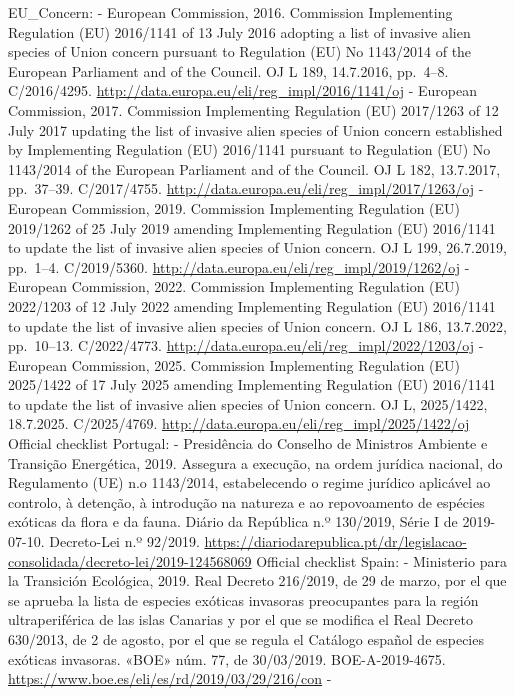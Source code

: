 \documentclass[
]{article}
\begin{document}
EU\_Concern: - European Commission, 2016. Commission Implementing
Regulation (EU) 2016/1141 of 13 July 2016 adopting a list of invasive
alien species of Union concern pursuant to Regulation (EU) No 1143/2014
of the European Parliament and of the Council. OJ L 189, 14.7.2016,
pp.~4--8. C/2016/4295.
\url{http://data.europa.eu/eli/reg_impl/2016/1141/oj} - European
Commission, 2017. Commission Implementing Regulation (EU) 2017/1263 of
12 July 2017 updating the list of invasive alien species of Union
concern established by Implementing Regulation (EU) 2016/1141 pursuant
to Regulation (EU) No 1143/2014 of the European Parliament and of the
Council. OJ L 182, 13.7.2017, pp.~37--39. C/2017/4755.
\url{http://data.europa.eu/eli/reg_impl/2017/1263/oj} - European
Commission, 2019. Commission Implementing Regulation (EU) 2019/1262 of
25 July 2019 amending Implementing Regulation (EU) 2016/1141 to update
the list of invasive alien species of Union concern. OJ L 199,
26.7.2019, pp.~1--4. C/2019/5360.
\url{http://data.europa.eu/eli/reg_impl/2019/1262/oj} - European
Commission, 2022. Commission Implementing Regulation (EU) 2022/1203 of
12 July 2022 amending Implementing Regulation (EU) 2016/1141 to update
the list of invasive alien species of Union concern. OJ L 186,
13.7.2022, pp.~10--13. C/2022/4773.
\url{http://data.europa.eu/eli/reg_impl/2022/1203/oj} - European
Commission, 2025. Commission Implementing Regulation (EU) 2025/1422 of
17 July 2025 amending Implementing Regulation (EU) 2016/1141 to update
the list of invasive alien species of Union concern. OJ L, 2025/1422,
18.7.2025. C/2025/4769.
\url{http://data.europa.eu/eli/reg_impl/2025/1422/oj} Official checklist
Portugal: - Presidência do Conselho de Ministros Ambiente e Transição
Energética, 2019. Assegura a execução, na ordem jurídica nacional, do
Regulamento (UE) n.o 1143/2014, estabelecendo o regime jurídico
aplicável ao controlo, à detenção, à introdução na natureza e ao
repovoamento de espécies exóticas da flora e da fauna. Diário da
República n.º 130/2019, Série I de 2019-07-10. Decreto-Lei n.º 92/2019.
\url{https://diariodarepublica.pt/dr/legislacao-consolidada/decreto-lei/2019-124568069}
Official checklist Spain: - Ministerio para la Transición Ecológica,
2019. Real Decreto 216/2019, de 29 de marzo, por el que se aprueba la
lista de especies exóticas invasoras preocupantes para la región
ultraperiférica de las islas Canarias y por el que se modifica el Real
Decreto 630/2013, de 2 de agosto, por el que se regula el Catálogo
español de especies exóticas invasoras. «BOE» núm. 77, de 30/03/2019.
BOE-A-2019-4675. \url{https://www.boe.es/eli/es/rd/2019/03/29/216/con} -
\end{document}
